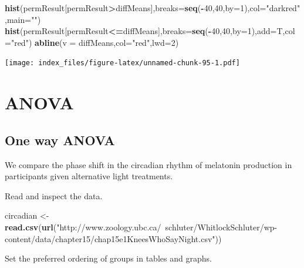 \documentclass[]{article}
\newenvironment{Shaded}{\begin{snugshade}}{\end{snugshade}}
\newcommand{\DataTypeTok}[1]{\textcolor[rgb]{0.13,0.29,0.53}{#1}}
\newcommand{\DecValTok}[1]{\textcolor[rgb]{0.00,0.00,0.81}{#1}}
\newcommand{\KeywordTok}[1]{\textcolor[rgb]{0.13,0.29,0.53}{\textbf{#1}}}
\newcommand{\NormalTok}[1]{#1}
\newcommand{\OperatorTok}[1]{\textcolor[rgb]{0.81,0.36,0.00}{\textbf{#1}}}
\newcommand{\StringTok}[1]{\textcolor[rgb]{0.31,0.60,0.02}{#1}}
\begin{document}
\begin{Shaded}
\begin{Highlighting}[]
\KeywordTok{hist}\NormalTok{(permResult[permResult}\OperatorTok{>}\NormalTok{diffMeans],}\DataTypeTok{breaks=}\KeywordTok{seq}\NormalTok{(}\OperatorTok{-}\DecValTok{40}\NormalTok{,}\DecValTok{40}\NormalTok{,}\DataTypeTok{by=}\DecValTok{1}\NormalTok{),}\DataTypeTok{col=}\StringTok{"darkred"}\NormalTok{,}\DataTypeTok{main=}\StringTok{""}\NormalTok{)}
\KeywordTok{hist}\NormalTok{(permResult[permResult}\OperatorTok{<=}\NormalTok{diffMeans],}\DataTypeTok{breaks=}\KeywordTok{seq}\NormalTok{(}\OperatorTok{-}\DecValTok{40}\NormalTok{,}\DecValTok{40}\NormalTok{,}\DataTypeTok{by=}\DecValTok{1}\NormalTok{),}\DataTypeTok{add=}\NormalTok{T,}\DataTypeTok{col=}\StringTok{"red"}\NormalTok{)}
\KeywordTok{abline}\NormalTok{(}\DataTypeTok{v =}\NormalTok{ diffMeans,}\DataTypeTok{col=}\StringTok{"red"}\NormalTok{,}\DataTypeTok{lwd=}\DecValTok{2}\NormalTok{)}
\end{Highlighting}
\end{Shaded}

\texttt{[image: index\_files/figure-latex/unnamed-chunk-95-1.pdf]}

\hypertarget{anova}{%
\section{ANOVA}\label{anova}}

\hypertarget{one-way-anova}{%
\subsection{One way ANOVA}\label{one-way-anova}}

We compare the phase shift in the circadian rhythm of melatonin
production in participants given alternative light treatments.

Read and inspect the data.

\begin{Shaded}
\begin{Highlighting}[]
\NormalTok{circadian <-}\StringTok{ }\KeywordTok{read.csv}\NormalTok{(}\KeywordTok{url}\NormalTok{(}\StringTok{"http://www.zoology.ubc.ca/~schluter/WhitlockSchluter/wp-content/data/chapter15/chap15e1KneesWhoSayNight.csv"}\NormalTok{))}
\end{Highlighting}
\end{Shaded}

Set the preferred ordering of groups in tables and graphs.
\end{document}
